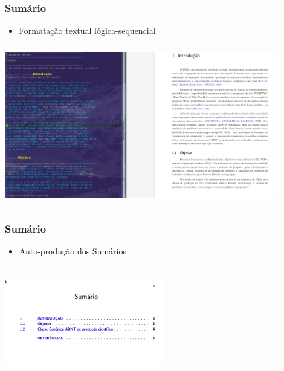 \documentclass{beamer}
\begin{document}
\begin{frame}
  \frametitle{Sumário}

  \begin{itemize}
  \item Formatação textual lógica-sequencial
  \end{itemize}

  \begin{center}
    \includegraphics[width=12cm,height=7cm]{../Imagens/A2I41.png}
  \end{center}

\end{frame}

\begin{frame}
  \frametitle{Sumário}

  \begin{itemize}
  \item Auto-produção dos Sumários
  \end{itemize}

  \begin{center}
    \includegraphics[width=7cm,height=5cm]{../Imagens/A2I42.png}
  \end{center}

\end{frame}
\end{document}
